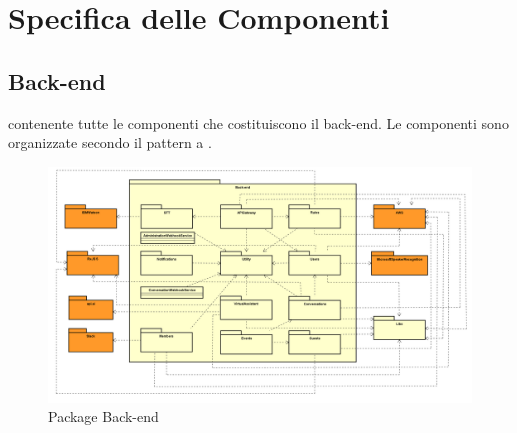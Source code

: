 \section{Specifica delle Componenti}\label{componenti}
\subsection{Back-end}\label{Back-end}
 contenente tutte le componenti che costituiscono il back-end. Le componenti sono organizzate secondo il pattern a .   \begin{figure}[h] \centering \includegraphics[width=\textwidth,height=\textheight,keepaspectratio]{images/diagrams/back-end/Official_Backend_0304/Back-end.png}
	\caption{Package Back-end}
\end{figure}
